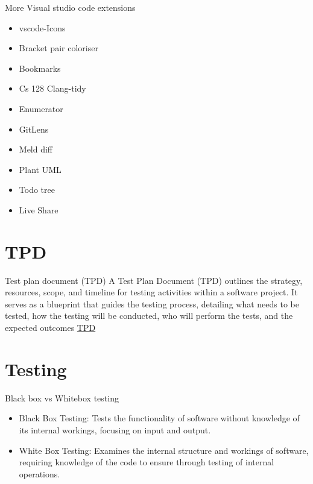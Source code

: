 \documentclass[10pt]{beamer}
\begin{document}
\begin{frame} {More Visual studio code extensions}
  \begin{itemize}
    \item vscode-Icons
    \item Bracket pair coloriser
    \item Bookmarks
    \item Cs 128 Clang-tidy
    \item Enumerator
    \item GitLens
    \item Meld diff
    \item Plant UML
    \item Todo tree
    \item Live Share
  \end{itemize}
  
\end{frame}

\section{TPD}
\begin{frame} {Test plan document (TPD)}
  A Test Plan Document (TPD) outlines the strategy, resources, scope, and timeline for testing activities within a software project. It serves as a blueprint that guides the testing process, detailing what needs to be tested, how the testing will be conducted, who will perform the tests, and the expected outcomes
  \href{https://docs.google.com/document/d/1lC8ZuRmzqU7DRiWEhfb8iwjCS3WTwKQk/edit?usp=sharing&ouid=109808472061203912811&rtpof=true&sd=true}{TPD}
\end{frame}

\section{Testing}
\begin{frame} {Black box vs Whitebox testing}
\begin{itemize}
  \item Black Box Testing: Tests the functionality of software without knowledge of its internal workings, focusing on input and output.
  \item White Box Testing: Examines the internal structure and workings of software, requiring knowledge of the code to ensure through testing of internal operations.
\end{itemize}
\end{frame}
\end{document}
